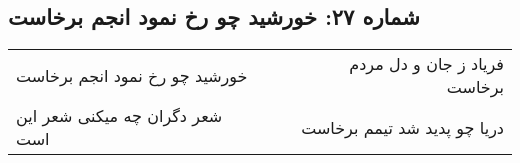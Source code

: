 \begin{center}
\section*{شماره ۲۷: خورشید چو رخ نمود انجم برخاست}
\label{sec:027}
\begin{longtable}{l p{0.5cm} r}
خورشید چو رخ نمود انجم برخاست
&&
فریاد ز جان و دل مردم برخاست
\\
شعر دگران چه میکنی شعر این است
&&
دریا چو پدید شد تیمم برخاست
\\
\end{longtable}
\end{center}
